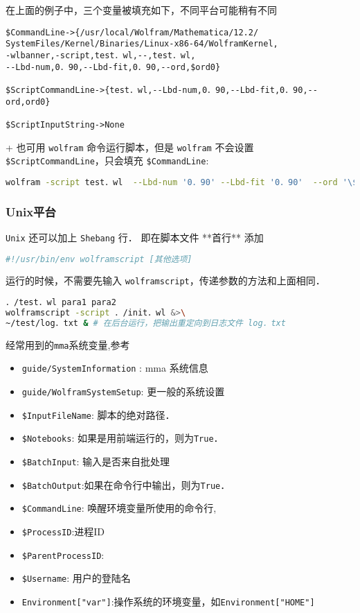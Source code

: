 在上面的例子中，三个变量被填充如下，不同平台可能稍有不同

\begin{lstlisting}
$CommandLine->{/usr/local/Wolfram/Mathematica/12.2/
SystemFiles/Kernel/Binaries/Linux-x86-64/WolframKernel,
-wlbanner,-script,test．wl,--,test．wl,
--Lbd-num,0．90,--Lbd-fit,0．90,--ord,$ord0}

$ScriptCommandLine->{test．wl,--Lbd-num,0．90,--Lbd-fit,0．90,--ord,ord0}

$ScriptInputString->None
\end{lstlisting}

+ 也可用 \verb`wolfram` 命令运行脚本，但是 \verb`wolfram` 不会设置 \verb`$ScriptCommandLine`，只会填充 \verb`$CommandLine`:

\begin{lstlisting}[language=bash]
wolfram -script test．wl  --Lbd-num '0．90' --Lbd-fit '0．90'  --ord '\$ord0'
\end{lstlisting}

\subsubsection{Unix平台} 

\verb`Unix` 还可以加上 \verb`Shebang` 行． 即在脚本文件 **首行** 添加
\begin{lstlisting}[language=bash]
#!/usr/bin/env wolframscript [其他选项]
\end{lstlisting}

运行的时候，不需要先输入 \verb`wolframscript`，传递参数的方法和上面相同．

\begin{lstlisting}[language=bash]
．/test．wl para1 para2
wolframscript -script ．/init．wl &>\
~/test/log．txt & # 在后台运行，把输出重定向到日志文件 log．txt
\end{lstlisting}

经常用到的\verb`mma`系统变量,参考

\begin{itemize}
\item \verb`guide/SystemInformation` : mma 系统信息
\item \verb`guide/WolframSystemSetup`: 更一般的系统设置
\item \verb`$InputFileName`: 脚本的绝对路径．
\item \verb`$Notebooks`: 如果是用前端运行的，则为\verb`True`．
\item \verb`$BatchInput`: 输入是否来自批处理
\item \verb`$BatchOutput`:如果在命令行中输出，则为\verb`True`．
\item \verb`$CommandLine`: 唤醒环境变量所使用的命令行,
\item \verb`$ProcessID`:进程ID
\item \verb`$ParentProcessID`:
\item \verb`$Username`: 用户的登陆名
\item \verb`Environment["var"]`:操作系统的环境变量，如\verb`Environment["HOME"]`
\end{itemize}
